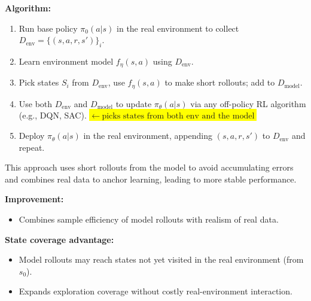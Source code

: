 \documentclass[12pt]{article}
\begin{document}
\item \textbf{Algorithm:}
\begin{enumerate}
    \item Run base policy $\pi_0(a|s)$ in the real environment to collect $D_{\text{env}} = \{(s,a,r,s')\}_i$.
    \item Learn environment model $f_\eta(s,a)$ using $D_{\text{env}}$.
    \item Pick states $S_i$ from $D_{\text{env}}$, use $f_\eta(s,a)$ to make short rollouts; add to $D_{\text{model}}$.
    \item Use both $D_{\text{env}}$ and $D_{\text{model}}$ to update $\pi_\theta(a|s)$ via any off-policy RL algorithm (e.g., DQN, SAC). \colorbox{yellow}{\(\leftarrow\ \text{picks states from both env and the model}\)}
    \item Deploy $\pi_\theta(a|s)$ in the real environment, appending $(s,a,r,s')$ to $D_{\text{env}}$ and repeat.
\end{enumerate}

This approach uses short rollouts from the model to avoid accumulating errors and combines real data to anchor learning, leading to more stable performance.

\item \textbf{Improvement:}
\begin{itemize}
    \item Combines sample efficiency of model rollouts with realism of real data.
\end{itemize}

\item \textbf{State coverage advantage:}
\begin{itemize}
    \item Model rollouts may reach states not yet visited in the real environment (from $s_0$).
    \item Expands exploration coverage without costly real-environment interaction.
\end{itemize}
\end{document}
